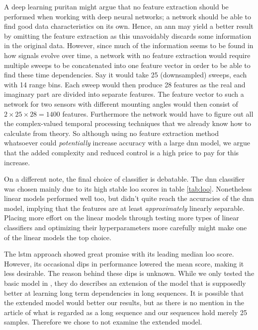 A deep learning puritan might argue that no feature extraction should be performed when working with deep neural networks; a network should be able to find good data characteristics on its own. Hence, an \gls{ann} may yield a better result by omitting the feature extraction as this unavoidably discards some information in the original data. However, since much of the information seems to be found in how signals evolve over time, a network with no feature extraction would require multiple sweeps to be concatenated into one feature vector in order to be able to find these time dependencies. Say it would take 25 (downsampled) sweeps, each with 14 range bins. Each sweep would then produce 28 features as the real and imaginary part are divided into separate features. The feature vector to such a network for two sensors with different mounting angles would then consist of $2\times25\times28=1400$ features. Furthermore the network would have to figure out all the complex-valued temporal processing techniques that we already know how to calculate from theory. So although using no feature extraction method whatsoever could \emph{potentially} increase accuracy with a large \gls{dnn} model, we argue that the added complexity and reduced control is a high price to pay for this increase. 

On a different note, the final choice of classifier is debatable. The \gls{dnn} classifier was chosen mainly due to its high stable \gls{loo} scores in table \ref{tab:loo}. Nonetheless linear models performed well too, but didn't quite reach the accuracies of the \gls{dnn} model, implying that the features are at least \emph{approximately} linearly separable. Placing more effort on the linear models through testing more types of linear classifiers and optimizing their hyperparameters more carefully might make one of the linear models the top choice.

The \gls{lstm} approach showed great promise with its leading median \gls{loo} score. However, its occasional dips in performance lowered the mean score, making it less desirable. The reason behind these dips is unknown. While we only tested the basic model in \citep{karim_majumdar_darabi_chen_2018}, they do describes an extension of the model that is supposedly better at learning long term dependencies in long sequences. It is possible that the extended model would better our results, but as there is no mention in the article of what is regarded as a long sequence and our sequences hold merely 25 samples. Therefore we chose to not examine the extended model.

